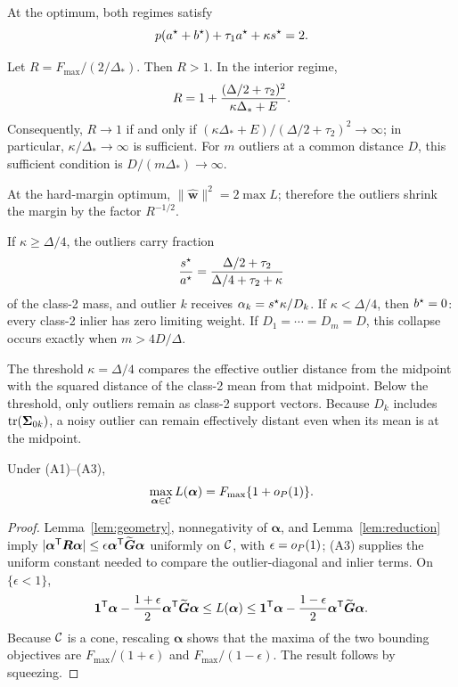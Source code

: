 At the optimum, both regimes satisfy
\begin{equation}\label{eq:identity}
p(a^{\star}+b^{\star})+\tau_1a^{\star}+\kappa s^{\star}=2.
\end{equation}

\begin{corollary}\label{cor:harmless}
Let $R=F_{\max}/(2/\Delta_*)$. Then $R>1$. In the interior regime,
\[
R=1+{(\Delta/2+\tau_2)^2\over\kappa\Delta_*+E}.
\]
Consequently, $R\to1$ if and only if $(\kappa\Delta_*+E)/(\Delta/2+\tau_2)^2\to\infty$; in particular, $\kappa/\Delta_*\to\infty$ is sufficient. For $m$ outliers at a common distance $D$, this sufficient condition is $D/(m\Delta_*)\to\infty$.
\end{corollary}
At the hard-margin optimum, $\lVert\widehat{\boldsymbol w}\rVert^2=2\max L$; therefore the outliers shrink the margin by the factor $R^{-1/2}$.

\begin{corollary}\label{cor:allocation}
If $\kappa\ge\Delta/4$, the outliers carry fraction
\[
{s^{\star}\over a^{\star}}={\Delta/2+\tau_2\over\Delta/4+\tau_2+\kappa}
\]
of the class-2 mass, and outlier $k$ receives $\alpha_k=s^{\star}\kappa/D_k$. If $\kappa<\Delta/4$, then $b^{\star}=0$: every class-2 inlier has zero limiting weight. If $D_1=\cdots=D_m=D$, this collapse occurs exactly when $m>4D/\Delta$.
\end{corollary}

\begin{remark}
The threshold $\kappa=\Delta/4$ compares the effective outlier distance from the midpoint with the squared distance of the class-2 mean from that midpoint. Below the threshold, only outliers remain as class-2 support vectors. Because $D_k$ includes $\operatorname{tr}(\boldsymbol\Sigma_{0k})$, a noisy outlier can remain effectively distant even when its mean is at the midpoint.
\end{remark}

\begin{theorem}\label{thm:transfer-value}
Under (A1)--(A3),
\[
\max_{\boldsymbol\alpha\in\mathcal{C}}L(\boldsymbol\alpha)
=F_{\max}\{1+o_{P}(1)\}.
\]
\end{theorem}
\begin{proof}
Lemma~\ref{lem:geometry}, nonnegativity of $\boldsymbol\alpha$, and Lemma~\ref{lem:reduction} imply
$|\boldsymbol\alpha^{\mathsf{T}}\boldsymbol R\boldsymbol\alpha|
\le\epsilon\boldsymbol\alpha^{\mathsf{T}}\widetilde{\boldsymbol G}\boldsymbol\alpha$ uniformly on $\mathcal{C}$, with $\epsilon=o_{P}(1)$; (A3) supplies the uniform constant needed to compare the outlier-diagonal and inlier terms. On $\{\epsilon<1\}$,
\[
\mathbf{1}^{\mathsf{T}}\boldsymbol\alpha-\frac{1+\epsilon}{2}\boldsymbol\alpha^{\mathsf{T}}\widetilde{\boldsymbol G}\boldsymbol\alpha
\le L(\boldsymbol\alpha)\le
\mathbf{1}^{\mathsf{T}}\boldsymbol\alpha-\frac{1-\epsilon}{2}\boldsymbol\alpha^{\mathsf{T}}\widetilde{\boldsymbol G}\boldsymbol\alpha.
\]
Because $\mathcal{C}$ is a cone, rescaling $\boldsymbol\alpha$ shows that the maxima of the two bounding objectives are $F_{\max}/(1+\epsilon)$ and $F_{\max}/(1-\epsilon)$. The result follows by squeezing.
\end{proof}
